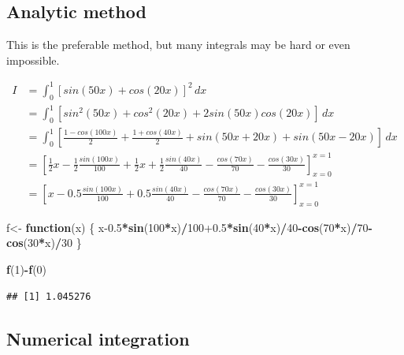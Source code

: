 \documentclass[
]{article}
\newenvironment{Shaded}{\begin{snugshade}}{\end{snugshade}}
\newcommand{\ControlFlowTok}[1]{\textcolor[rgb]{0.13,0.29,0.53}{\textbf{#1}}}
\newcommand{\DecValTok}[1]{\textcolor[rgb]{0.00,0.00,0.81}{#1}}
\newcommand{\FloatTok}[1]{\textcolor[rgb]{0.00,0.00,0.81}{#1}}
\newcommand{\FunctionTok}[1]{\textcolor[rgb]{0.13,0.29,0.53}{\textbf{#1}}}
\newcommand{\NormalTok}[1]{#1}
\newcommand{\OtherTok}[1]{\textcolor[rgb]{0.56,0.35,0.01}{#1}}
\newcommand{\SpecialCharTok}[1]{\textcolor[rgb]{0.81,0.36,0.00}{\textbf{#1}}}
\begin{document}
\hypertarget{analytic-method}{%
\subsection{Analytic method}\label{analytic-method}}

This is the preferable method, but many integrals may be hard or even
impossible.

\begin{align*}
I  & = \int_0^1 [sin(50x)+cos(20x)]^2 \, dx\\
& =\int_0^1 [sin^2(50x)+cos^2(20x)+2sin(50x)cos(20x)]\, dx\\
& =\int_0^1 [\frac{1-cos(100x)}{2}+\frac{1+cos(40x)}{2}+sin(50x+20x)+sin(50x-20x)]\, dx\\
& =\left[\frac{1}{2}x-\frac{1}{2}\frac{sin(100x)}{100}+\frac{1}{2}x+\frac{1}{2}\frac{sin(40x)}{40}-\frac{cos(70x)}{70}-\frac{cos(30x)}{30}\right]_{x=0}^{x=1}\\
&= \left[x- 0.5 \frac{sin(100x)}{100}+0.5 \frac{sin(40x)}{40}-\frac{cos(70x)}{70}-\frac{cos(30x)}{30}\right]_{x=0}^{x=1}
\end{align*}

\begin{Shaded}
\begin{Highlighting}[]
\NormalTok{f}\OtherTok{\textless{}{-}} \ControlFlowTok{function}\NormalTok{(x) \{}
\NormalTok{  x}\FloatTok{{-}0.5}\SpecialCharTok{*}\FunctionTok{sin}\NormalTok{(}\DecValTok{100}\SpecialCharTok{*}\NormalTok{x)}\SpecialCharTok{/}\DecValTok{100}\FloatTok{+0.5}\SpecialCharTok{*}\FunctionTok{sin}\NormalTok{(}\DecValTok{40}\SpecialCharTok{*}\NormalTok{x)}\SpecialCharTok{/}\DecValTok{40}\SpecialCharTok{{-}}\FunctionTok{cos}\NormalTok{(}\DecValTok{70}\SpecialCharTok{*}\NormalTok{x)}\SpecialCharTok{/}\DecValTok{70}\SpecialCharTok{{-}}\FunctionTok{cos}\NormalTok{(}\DecValTok{30}\SpecialCharTok{*}\NormalTok{x)}\SpecialCharTok{/}\DecValTok{30}
\NormalTok{\}}

\FunctionTok{f}\NormalTok{(}\DecValTok{1}\NormalTok{)}\SpecialCharTok{{-}}\FunctionTok{f}\NormalTok{(}\DecValTok{0}\NormalTok{)}
\end{Highlighting}
\end{Shaded}

\begin{verbatim}
## [1] 1.045276
\end{verbatim}

\hypertarget{numerical-integration}{%
\subsection{Numerical integration}\label{numerical-integration}}
\end{document}
